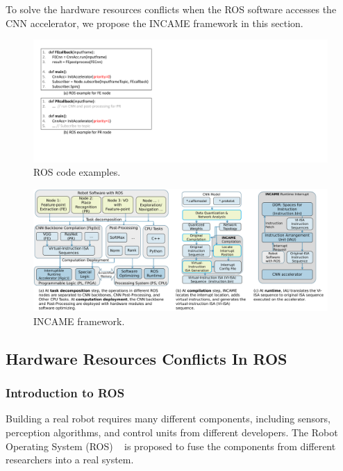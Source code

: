 \label{sec:incame}

To solve the hardware resources conflicts when the ROS software accesses the CNN accelerator, we propose the INCAME framework in this section.



\begin{figure}[t]
	\centering
    \includegraphics[width=0.9\linewidth]{fig/codeexample.pdf}
    \caption{ ROS code examples.}
	\label{fig:rosexample}
\end{figure}

\begin{figure}[t]
	\centering
    \includegraphics[width=0.99\linewidth]{fig/incame.pdf}
    \caption{ INCAME framework.}
	\label{fig:incame}
\end{figure}

\subsection{Hardware Resources Conflicts In ROS}
\subsubsection{Introduction to ROS} Building a real robot requires many different components, including sensors, perception algorithms, and control units from different developers. The Robot Operating System (ROS)  ~\cite{quigley2009ros} is proposed to fuse the components from different researchers into a real system.

